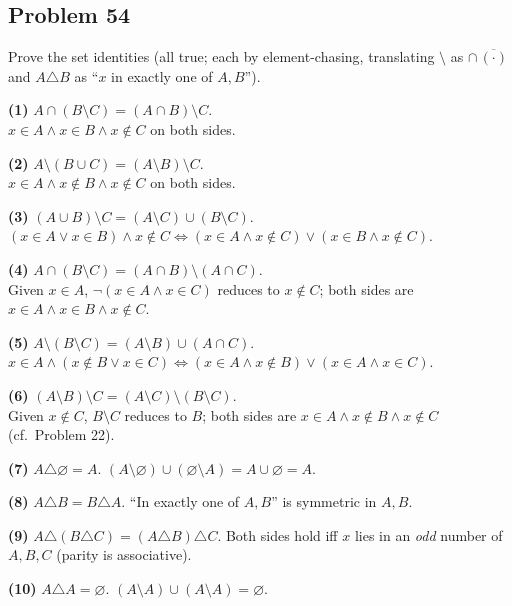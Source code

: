 \subsection*{Problem 54}
Prove the set identities (all true; each by element-chasing, translating $\setminus$ as $\cap\,\overline{(\cdot)}$ and $A \triangle B$ as ``$x$ in exactly one of $A, B$'').

\textbf{(1)} $A \cap (B \setminus C) = (A \cap B) \setminus C$. \\
$x \in A \land x \in B \land x \notin C$ on both sides. \checkmark

\textbf{(2)} $A \setminus (B \cup C) = (A \setminus B) \setminus C$. \\
$x \in A \land x \notin B \land x \notin C$ on both sides. \checkmark

\textbf{(3)} $(A \cup B) \setminus C = (A \setminus C) \cup (B \setminus C)$. \\
$(x \in A \lor x \in B) \land x \notin C \iff (x \in A \land x \notin C) \lor (x \in B \land x \notin C)$. \checkmark

\textbf{(4)} $A \cap (B \setminus C) = (A \cap B) \setminus (A \cap C)$. \\
Given $x \in A$, $\lnot(x \in A \land x \in C)$ reduces to $x \notin C$; both sides are $x \in A \land x \in B \land x \notin C$. \checkmark

\textbf{(5)} $A \setminus (B \setminus C) = (A \setminus B) \cup (A \cap C)$. \\
$x \in A \land (x \notin B \lor x \in C) \iff (x \in A \land x \notin B) \lor (x \in A \land x \in C)$. \checkmark

\textbf{(6)} $(A \setminus B) \setminus C = (A \setminus C) \setminus (B \setminus C)$. \\
Given $x \notin C$, $B \setminus C$ reduces to $B$; both sides are $x \in A \land x \notin B \land x \notin C$ (cf.\ Problem 22). \checkmark

\textbf{(7)} $A \triangle \varnothing = A$. \quad $(A \setminus \varnothing) \cup (\varnothing \setminus A) = A \cup \varnothing = A$. \checkmark

\textbf{(8)} $A \triangle B = B \triangle A$. \quad ``In exactly one of $A, B$'' is symmetric in $A, B$. \checkmark

\textbf{(9)} $A \triangle (B \triangle C) = (A \triangle B) \triangle C$. \quad Both sides hold iff $x$ lies in an \emph{odd} number of $A, B, C$ (parity is associative). \checkmark

\textbf{(10)} $A \triangle A = \varnothing$. \quad $(A \setminus A) \cup (A \setminus A) = \varnothing$. \checkmark

